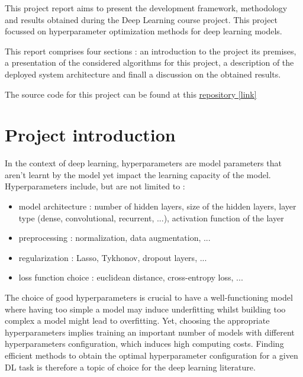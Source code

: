 \documentclass[a4 paper,11pt,2]{article}
\begin{document}


\tableofcontents
\newpage

This project report aims to present the development framework, methodology and
results obtained during the Deep Learning course project. This project focussed
on hyperparameter optimization methods for deep learning models.

This report comprises four sections : an introduction to the project its
premises, a presentation of the considered algorithms for this project, a
description of the deployed system architecture and finall a discussion on the
obtained results.

The source code for this project can be found at this
\href{https://github.com/QuentinGoulas/Hyper-parameters-optimization.git}{repository
        [link]}

\section{Project introduction}
In the context of deep learning, hyperparameters are model parameters that
aren't learnt by the model yet impact the learning capacity of the model.
Hyperparameters include, but are not limited to :
\begin{itemize}
    \item model architecture : number of hidden layers, size of the hidden layers, layer
          type (dense, convolutional, recurrent, ...), activation function of the layer
    \item preprocessing : normalization, data augmentation, ...
    \item regularization : Lasso, Tykhonov, dropout layers, ...
    \item loss function choice : euclidean distance, cross-entropy loss, ...
\end{itemize}

The choice of good hyperparameters is crucial to have a well-functioning model
where having too simple a model may induce underfitting whilst building too
complex a model might lead to overfitting. Yet, choosing the appropriate
hyperparameters implies training an important number of models with different
hyperparameters configuration, which induces high computing costs. Finding
efficient methods to obtain the optimal hyperparameter configuration for a
given DL task is therefore a topic of choice for the deep learning literature.
\end{document}
